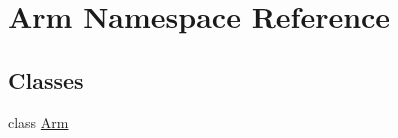 \hypertarget{namespace_arm}{}\section{Arm Namespace Reference}
\label{namespace_arm}
\subsection*{Classes}
\begin{DoxyCompactItemize}
\item 
class \mbox{\hyperlink{class_arm_1_1_arm}{Arm}}
\end{DoxyCompactItemize}
